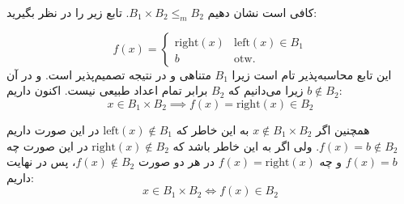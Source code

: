 کافی است نشان دهیم $B_1 \times B_2 \leq_m B_2$. تابع زیر را در نظر بگیرید:

$$
f(x) = \begin{cases}
    \text{right}(x) & \text{left}(x) \in B_1 \\
    b & \text{otw.}
\end{cases}
$$
این تابع محاسبه‌پذیر تام است زیرا $B_1$ متناهی و در نتیجه تصمیم‌پذیر است.
و در آن $b \notin B_2$ زیرا می‌دانیم که $B_2$ برابر تمام اعداد طبیعی نیست. اکنون داریم:
$$
x\in B_1 \times B_2 \implies f(x) = \text{right}(x) \in B_2
$$

همچنین اگر $x\notin B_1 \times B_2$ به این خاطر که $\text{left}(x) \notin B_1$
در این صورت داریم
$f(x)=b\notin B_2$.
ولی اگر به این خاطر باشد که $\text{right}(x) \notin B_2$ در این صورت چه $f(x)=b$ و چه $f(x) = \text{right}(x)$ در هر دو صورت $f(x)\notin B_2$، پس در نهایت داریم:
$$
x \in B_1 \times B_2 \iff f(x) \in B_2
$$